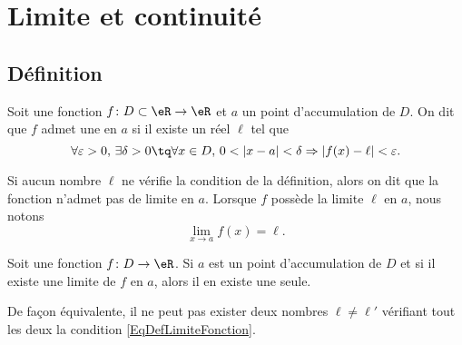 
\section{Limite et continuité}
\label{SecLimiteFontion}

\subsection{Définition}

\begin{definition}	\label{DefLimiteFonction}
	Soit une fonction $f\colon D\subset\eR\to \eR$ et $a$ un point d'accumulation de $D$. On dit que $f$ admet une  en $a$ si il existe un réel $\ell$ tel que 
	\begin{equation}\label{EqDefLimiteFonction}
		\forall\varepsilon>0,\,\exists\delta>0\tq \forall x\in D,\, 0<| x-a |<\delta\Rightarrow| f(x)-\ell |<\varepsilon.
	\end{equation}
\end{definition}

Si aucun nombre $\ell$ ne vérifie la condition de la définition, alors on dit que la fonction n'admet pas de limite en $a$. Lorsque $f$ possède la limite $\ell$ en $a$, nous notons
\begin{equation}
	\lim_{x\to a} f(x)=\ell.
\end{equation}

\begin{proposition}
	Soit une fonction $f\colon D\to \eR$. Si $a$ est un point d'accumulation de $D$ et si il existe une limite de $f$ en $a$, alors il en existe une seule. 
\end{proposition}

De façon équivalente, il ne peut pas exister deux nombres $\ell\neq\ell'$ vérifiant tout les deux la condition \eqref{EqDefLimiteFonction}.


